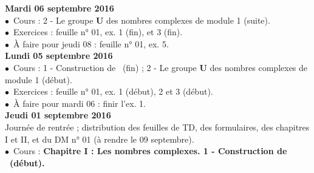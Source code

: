 \documentclass[12pt,a4paper]{article}
\begin{document}
\noindent\textbf{\bf Mardi 06 septembre 2016 }\\
$\bullet$\ Cours : 2 - Le groupe \textbf{U} des nombres complexes de 
module 1 (suite).\\
$\bullet$\ Exercices : feuille n° 01, ex. 1 (fin), et 3 (fin).\\
$\bullet$\ À faire pour jeudi 08 : feuille n° 01, ex. 5.\vspace{.4cm}\\

\noindent\textbf{\bf Lundi 05 septembre 2016 }\\
$\bullet$\ Cours : 1 - Construction de \C\ (fin) ; 2 - Le groupe \textbf{U} des nombres complexes de 
module 1 (début).\\
$\bullet$\ Exercices : feuille n° 01, ex. 1 (début), 2 et 3 (début).\\
$\bullet$\ À faire pour mardi 06 : finir l'ex. 1.\vspace{.4cm}\\

\noindent\textbf{\bf Jeudi 01 septembre 2016 }\\
Journée de rentrée ; distribution des feuilles de TD, des formulaires, des
chapitres I et II, et du DM n° 01 (à rendre le 09 septembre).\\
$\bullet$\ Cours : \bf Chapitre I \rm : Les nombres complexes. 1 - Construction
de \C\ (début).\vspace{.4cm}\\


\label{end}
\end{document}
